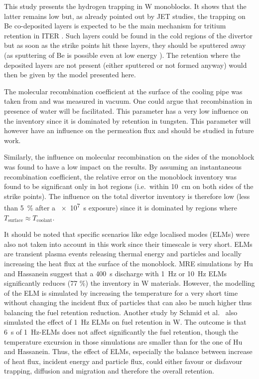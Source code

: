 This study presents the hydrogen trapping in W monoblocks.
It shows that the latter remains low but, as already pointed out by JET studies, the trapping on Be co-deposited layers is expected to be the main mechanism for tritium retention in ITER .
Such layers could be found in the cold regions of the divertor but as soon as the strike points hit these layers, they should be sputtered away (as sputtering of Be is possible even at low energy \cite{bjorkas_variables_2013, brezinsek_beryllium_2015}).
The retention where the deposited layers are not present (either sputtered or not formed anyway) would then be given by the model presented here.

The molecular recombination coefficient at the surface of the cooling pipe was taken from  and was measured in vacuum.
One could argue that recombination in presence of water will be facilitated.
This parameter has a very low influence on the inventory since it is dominated by retention in tungsten.
This parameter will however have an influence on the permeation flux and should be studied in future work.

Similarly, the influence on molecular recombination on the sides of the monoblock was found to have a low impact on the results.
By assuming an instantaneous recombination coefficient, the relative error on the monoblock inventory was found to be significant only in hot regions (i.e.\ within \SI{10}{cm} on both sides of the strike points).
The influence on the total divertor inventory is therefore low (less than \SI{5}{\%} after a \SI{e7}{s} exposure) since it is dominated by regions where $T_\mathrm{surface} \approx T_\mathrm{coolant}$.

It should be noted that specific scenarios like edge localised modes (ELMs) were also not taken into account in this work since their timescale is very short.
ELMs are transient plasma events releasing thermal energy and particles and locally increasing the heat flux at the surface of the monoblock.
MRE simulations by Hu and Hassanein  suggest that a \SI{400}{s} discharge with \SI{1}{Hz} or \SI{10}{Hz} ELMs significantly reduces (77 \%) the inventory in W materials.
However, the modelling of the ELM is simulated by increasing the temperature for a very short time without changing the incident flux of particles that can also be much higher thus balancing the fuel retention reduction.
Another study by Schmid et al.\  also simulated the effect of \SI{1}{Hz} ELMs on fuel retention in W.
The outcome is that \SI{6}{s} of \SI{1}{Hz}-ELMs does not affect significantly the fuel retention, though the temperature excursion in those simulations are smaller than for the one of Hu and Hassanein.
Thus, the effect of ELMs, especially the balance between increase of heat flux, incident energy and particle flux, could either favour or disfavour trapping, diffusion and migration and therefore the overall retention.
  
